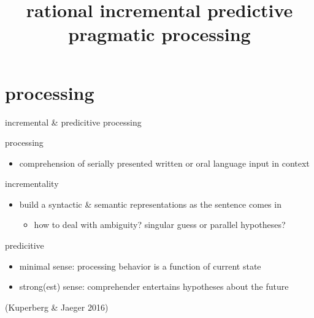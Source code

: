 \documentclass[ignorenonframetext,]{beamer}
\title{rational incremental predictive pragmatic processing}
\date{}
\providecommand{\tightlist}{%
\setlength{\itemsep}{0pt}\setlength{\parskip}{0pt}}
\begin{document}
\frame{\titlepage}

\section{processing}\label{processing}

\begin{frame}{incremental \& predicitive processing}

{processing}

\begin{itemize}
\tightlist
\item
  comprehension of serially presented written or oral language input in
  context
\end{itemize}

{incrementality}

\begin{itemize}
\item
  build a syntactic \& semantic representations as the sentence comes in

  \begin{itemize}
  \tightlist
  \item
    how to deal with ambiguity? singular guess or parallel hypotheses?
  \end{itemize}
\end{itemize}

{predicitive}

\begin{itemize}
\item
  minimal sense: processing behavior is a function of current state
\item
  strong(est) sense: comprehender entertains hypotheses about the future
\end{itemize}

\bigskip

\hfill  (Kuperberg \& Jaeger 2016)

\end{frame}
\end{document}
